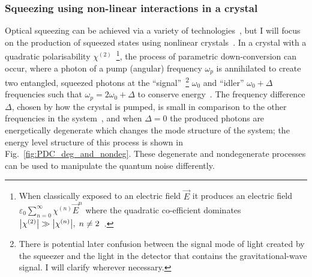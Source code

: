\subsubsection{Squeezing using non-linear interactions in a crystal}
Optical squeezing can be achieved via a variety of technologies~\cite{}, but I will focus on the production of squeezed states using nonlinear crystals~\cite{}. In a crystal with a quadratic polarisability $\chi^{(2)}$~\footnote{When classically exposed to an electric field $\vec E$ it produces an electric field $\varepsilon_0 \sum_{n=0}^\infty \chi^{(n)} {\vec E}^n$ where the quadratic co-efficient dominates $\abs{\chi^{(2)}}\gg\abs{\chi^{(n)}},\; n\neq2$~\cite{theresNoRefinKirkthesis?}.}, the process of parametric down-conversion can occur, where a photon of a pump (angular) frequency $\omega_p$ is annihilated to create two entangled, squeezed photons at the ``signal''~\footnote{There is potential later confusion between the signal mode of light created by the squeezer and the light in the detector that contains the gravitational-wave signal. I will clarify wherever necessary.} $\omega_0$ and ``idler'' $\omega_0+\Delta$ frequencies such that $\omega_p=2\omega_0+\Delta$ to conserve energy~\cite{}. The frequency difference $\Delta$, chosen by how the crystal is pumped, is small in comparison to the other frequencies in the system~\cite{}, and when $\Delta=0$ the produced photons are energetically degenerate which changes the mode structure of the system; the energy level structure of this process is shown in Fig.~\ref{fig:PDC_deg_and_nondeg}. %
These degenerate and nondegenerate processes can be used to manipulate the quantum noise differently. %



